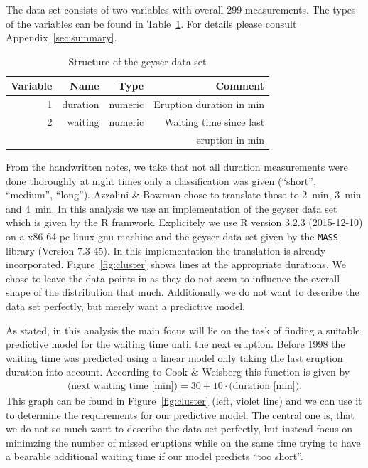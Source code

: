 \documentclass[english,final]{scrartcl}
\begin{document}
The data set consists of two variables with overall 299 measurements. The types of the variables can be found in Table~\ref{tab:str}. For details please consult Appendix~\ref{sec:summary}. 

\begin{table}[htbp]
  \centering
  \begin{tabular}{rrrr}
    \toprule
    Variable & Name & Type & Comment\\
    \midrule
    1 & duration & numeric & Eruption duration in \si{\minute}\\
    2 & waiting & numeric & Waiting time since last \\
    & & & eruption in \si{\minute}\\
    \bottomrule
  \end{tabular}
  \caption{Structure of the geyser data set}
  \label{tab:str}
\end{table}

From the handwritten notes, we take that not all duration measurements were done thoroughly at night times only a classification was given (\enquote{short}, \enquote{medium}, \enquote{long}). Azzalini \& Bowman chose to translate those to \SI{2}{\minute}, \SI{3}{\minute} and \SI{4}{\minute}. In this analysis we use an implementation of the geyser data set which is given by the R framwork. Explicitely we use R version 3.2.3 (2015-12-10) on a x86-64-pc-linux-gnu machine and the geyser data set given by the \texttt{MASS} library (Version 7.3-45). In this implementation the translation is already incorporated. Figure~\ref{fig:cluster} shows lines at the appropriate durations. We chose to leave the data points in as they do not seem to influence the overall shape of the distribution that much. Additionally we do not want to describe the data set perfectly, but merely want a predictive model. 

As stated, in this analysis the main focus will lie on the task of finding a suitable predictive model for the waiting time until the next eruption. Before 1998 the waiting time was predicted using a linear model only taking the last eruption duration into account. According to Cook \& Weisberg \cite{pred} this function is given by
\begin{align}
\text{(next waiting time [min])} = 30 + 10 \cdot \text{(duration [min])}.
\label{eq:opred}
\end{align}
This graph can be found in Figure~\ref{fig:cluster} (left, violet line) and we can use it to determine the requirements for our predictive model. The central one is, that we do not so much want to describe the data set perfectly, but instead focus on minimzing the number of missed eruptions while on the same time trying to have a bearable additional waiting time if our model predicts \enquote{too short}.
\end{document}

